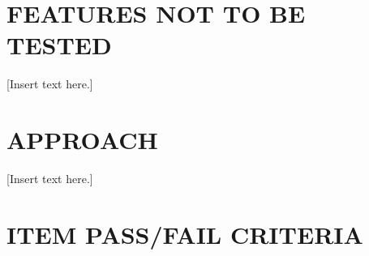 \documentclass[twoside,letterpaper]{article}
\begin{document}
\subsection[]{\bfseries }

\bigskip

\subsection[]{\bfseries }

\bigskip





\section[FEATURES NOT TO BE TESTED]{\bfseries
FEATURES NOT TO BE TESTED}

[Insert text here.]


\section[APPROACH]{\bfseries APPROACH}

[Insert text here.]


\section[ITEM PASS/FAIL CRITERIA]
{\bfseries ITEM PASS/FAIL CRITERIA}

\end{document}
